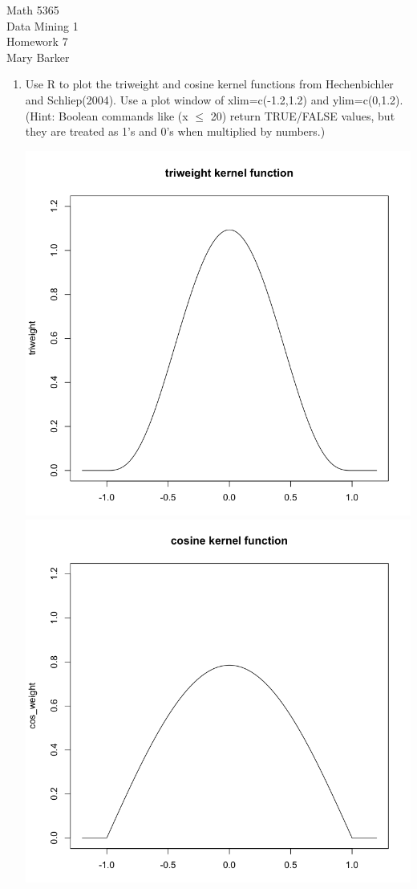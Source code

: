 \documentclass[11pt]{article}
\begin{document}
\noindent\large{Math 5365}\\
\large{Data Mining 1}\\
\large{Homework 7}\\
\large{Mary Barker}
\doublespace
\begin{enumerate}
\item 
    Use R to plot the triweight and cosine kernel functions from 
    Hechenbichler and Schliep(2004). Use a plot window of 
    xlim=c(-1.2,1.2) and ylim=c(0,1.2). 
    (Hint: Boolean commands like (x $\le$ 20) return TRUE/FALSE values, 
    but they are treated as 1's and 0's when multiplied by numbers.)
    
    \begin{center}
    \includegraphics[scale=0.25]{kernelfunction}
    \includegraphics[scale=0.25]{cosinefunction}
    \end{center}


\end{enumerate}
\end{document}

